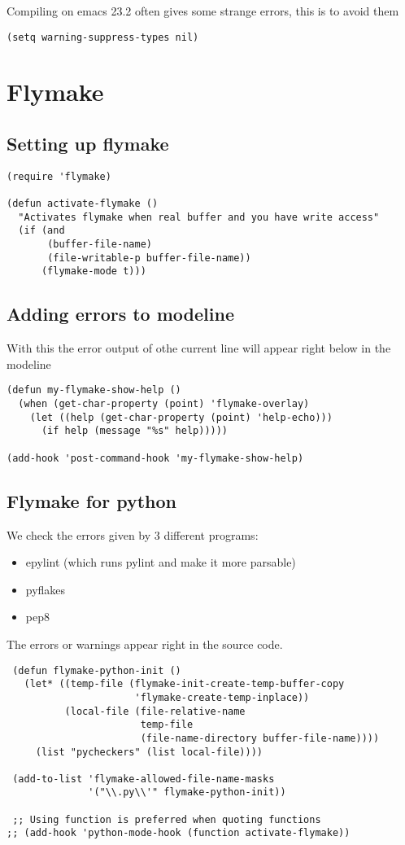 \documentclass[11pt]{article}
\begin{document}
   Compiling on emacs 23.2 often gives some strange errors, this is to avoid them
\begin{verbatim}
(setq warning-suppress-types nil)
\end{verbatim}
\section{Flymake}
\label{sec-38}
\subsection{Setting up flymake}
\label{sec-38.1}

\begin{verbatim}
(require 'flymake)

(defun activate-flymake ()
  "Activates flymake when real buffer and you have write access"
  (if (and
       (buffer-file-name)
       (file-writable-p buffer-file-name))
      (flymake-mode t)))
\end{verbatim}
\subsection{Adding errors to modeline}
\label{sec-38.2}

   With this the error output of othe current line will appear right below in the modeline
\begin{verbatim}
(defun my-flymake-show-help ()
  (when (get-char-property (point) 'flymake-overlay)
    (let ((help (get-char-property (point) 'help-echo)))
      (if help (message "%s" help)))))

(add-hook 'post-command-hook 'my-flymake-show-help)
\end{verbatim}
\subsection{Flymake for python}
\label{sec-38.3}

   We check the errors given by 3 different programs:
\begin{itemize}
\item epylint (which runs pylint and make it more parsable)
\item pyflakes
\item pep8
\end{itemize}

   The errors or warnings appear right in the source code.
   
\begin{verbatim}
 (defun flymake-python-init () 
   (let* ((temp-file (flymake-init-create-temp-buffer-copy 
                      'flymake-create-temp-inplace)) 
          (local-file (file-relative-name 
                       temp-file 
                       (file-name-directory buffer-file-name)))) 
     (list "pycheckers" (list local-file))))

 (add-to-list 'flymake-allowed-file-name-masks 
              '("\\.py\\'" flymake-python-init))

 ;; Using function is preferred when quoting functions
;; (add-hook 'python-mode-hook (function activate-flymake))
\end{verbatim}
\end{document}
